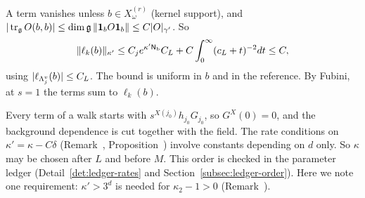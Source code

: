 \begin{detail}
\begin{step}
\begin{itemize}
\end{itemize}
A term vanishes unless $b\in X_\omega^{(r)}$ (kernel support), and $|\operatorname{tr}_{\mathfrak g}O(b,b)|\le\dim\mathfrak g\,\|\mathbf 1_bO\mathbf 1_b\|\le C|O|_{\gamma'}$. So
\[
\|\ell_k(b)\|_{\kappa'}\le C_je^{\kappa'\mathsf N_{\rm b}}C_L+C\int_0^\infty(c_L+t)^{-2}dt\le C ,
\]
using $|\ell_{\Lambda^v_j}(b)|\le C_L$. The bound is uniform in $b$ and in the reference. By Fubini, at $s=1$ the terms sum to $\ell_k(b)$.
\end{step}
\end{detail}

\begin{detail}\label{d9:scope}
Every term of a walk starts with $s^{X(j_0)}h_{j_0}G_{j_0}$, so $G^X(0)=0$, and the background dependence is cut together with the field. The rate conditions on $\kappa'=\kappa-C\delta$ (Remark~, Proposition~) involve constants depending on $d$ only. So $\kappa$ may be chosen after $L$ and before $M$. This order is checked in the parameter ledger (Detail~\ref{det:ledger-rates} and Section~\ref{subsec:ledger-order}). Here we note one requirement: $\kappa'>3^d$ is needed for $\kappa_2-1>0$ (Remark~).
\end{detail}

